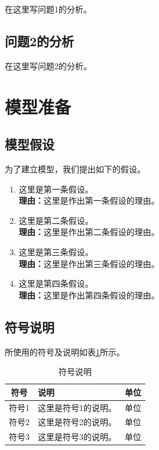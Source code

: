 \documentclass[12pt, a4paper, oneside]{ctexart}
\begin{document}
    在这里写问题1的分析。

    \subsection{问题2的分析}

    在这里写问题2的分析。

    \section{模型准备}

    \subsection{模型假设}

    为了建立模型，我们提出如下的假设。

    \begin{enumerate}
        \item 这里是第一条假设。
        \\\textbf{理由：}这里是作出第一条假设的理由。
        \item 这里是第二条假设。
        \\\textbf{理由：}这里是作出第二条假设的理由。
        \item 这里是第三条假设。
        \\\textbf{理由：}这里是作出第三条假设的理由。
        \item 这里是第四条假设。
        \\\textbf{理由：}这里是作出第四条假设的理由。
    \end{enumerate}

    \subsection{符号说明}

    所使用的符号及说明如表\ref{table1}所示。

    \begin{table}[h]
        \caption{符号说明}\label{table1}
        \centering
        \begin{tabular}{clc}
            \hline
            \textbf{符号} & \textbf{说明}        & \textbf{单位}   \\ \hline
            符号1         & 这里是符号1的说明。  & 单位             \\
            符号2         & 这里是符号2的说明。  & 单位             \\
            符号3         & 这里是符号3的说明。  & 单位             \\ \hline
        \end{tabular}
    \end{table}
\end{document}
